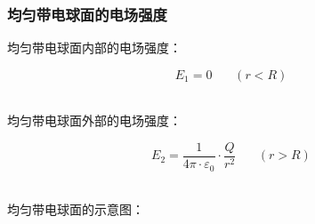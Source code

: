 \documentclass[UTF8]{ctexart}
\begin{document}
\newpage

\subsubsection{均匀带电球面的电场强度}
    \setcounter{equation}{0}
    均匀带电球面内部的电场强度：
    \begin{large}
        \begin{equation*}
            E_1=0~~~~~~~~(r<R)
        \end{equation*}
    \end{large}\\
    均匀带电球面外部的电场强度：
    \begin{large}
        \begin{equation*}
            E_2=\frac{1}{4\pi\cdot\varepsilon_0}\cdot\frac{Q}{r^2}~~~~~~~~(r>R)
        \end{equation*}
    \end{large}\\
    均匀带电球面的示意图：\vspace{3pt}
\end{document}
